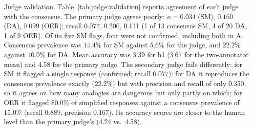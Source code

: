 \documentclass[journal,article,submit,pdftex,moreauthors]{Definitions/mdpi}
\begin{document}
Judge validation. Table~\ref{tab:judge:validation} reports agreement of each judge with the consensus. The primary judge agrees poorly: $\kappa = 0.034$ (SM), $0.160$ (DA), $0.099$ (OER); recall 0.077, 0.200, 0.111 (1 of 13 consensus SM, 4 of 20 DA, 1 of 9 OER). Of its five SM flags, four were not confirmed, including both in A. Consensus prevalence was $14.4\%$ for SM against $5.6\%$ for the judge, and $22.2\%$ against $10.0\%$ for DA. Mean accuracy was 3.39 for h1 (3.67 for the two-annotator mean) and 4.58 for the primary judge. The secondary judge fails differently: for SM it flagged a single response (confirmed; recall 0.077); for DA it reproduces the consensus prevalence exactly ($22.2\%$) but with precision and recall of only 0.350, so it agrees on how many analogies are dangerous but only partly on which; for OER it flagged $80.0\%$ of simplified responses against a consensus prevalence of $15.0\%$ (recall 0.889, precision 0.167). Its accuracy scores are closer to the human level than the primary judge's (4.24 vs.\ 4.58).

\begin{table}[H]
\caption{Agreement of the two LLM judges with the human consensus on the 90-response validation subsample (J1 = primary, J2 = secondary). Prev. = prevalence of flags (SM, DA over 90 responses; OER over the 60 simplified responses); for accuracy, quadratic-weighted $\kappa$ is against annotator h1 and prevalence is the mean score.}
\label{tab:judge:validation}
\centering
\footnotesize
{}
\end{table}
\end{document}
